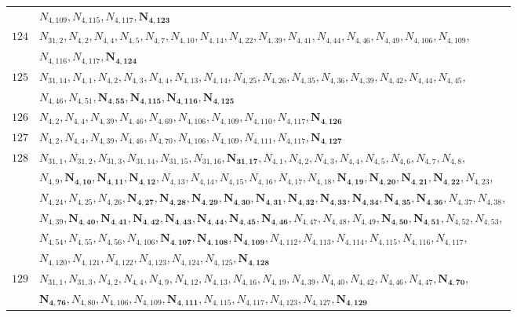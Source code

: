 \documentclass{amsart}
\theoremstyle{plain}
\theoremstyle{definition}
\theoremstyle{remark}
\begin{document}
{\begin{longtable}{ll}
& $N_{4,109}, N_{4,115}, N_{4,117}, \bm{N_{4,123}}$\\
$124$ & $N_{31,2}, N_{4,2}, N_{4,4}, N_{4,5}, N_{4,7}, N_{4,10}, N_{4,14}, N_{4,22}, N_{4,39}, N_{4,41}, N_{4,44}, N_{4,46}, N_{4,49}, N_{4,106}, N_{4,109}$,\\ 
& $N_{4,116}, N_{4,117}, \bm{N_{4,124}}$\\
$125$ & $N_{31,14}, N_{4,1}, N_{4,2}, N_{4,3}, N_{4,4}, N_{4,13}, N_{4,14}, N_{4,25}, N_{4,26}, N_{4,35}, N_{4,36}, N_{4,39}, N_{4,42}, N_{4,44}, N_{4,45}$,\\ 
& $N_{4,46}, N_{4,51}, \bm{N_{4,55}}, \bm{N_{4,115}}, \bm{N_{4,116}}, \bm{N_{4,125}}$\\
$126$ & $N_{4,2}, N_{4,4}, N_{4,39}, N_{4,46}, N_{4,69}, N_{4,106}, N_{4,109}, N_{4,110}, N_{4,117}, \bm{N_{4,126}}$\\
$127$ & $N_{4,2}, N_{4,4}, N_{4,39}, N_{4,46}, N_{4,70}, N_{4,106}, N_{4,109}, N_{4,111}, N_{4,117}, \bm{N_{4,127}}$\\
$128$ & $N_{31,1}, N_{31,2}, N_{31,3}, N_{31,14}, N_{31,15}, N_{31,16}, \bm{N_{31,17}}, N_{4,1}, N_{4,2}, N_{4,3}, N_{4,4}, N_{4,5}, N_{4,6}, N_{4,7}, N_{4,8}$,\\ 
& $N_{4,9}, \bm{N_{4,10}}, \bm{N_{4,11}}, \bm{N_{4,12}}, N_{4,13}, N_{4,14}, N_{4,15}, N_{4,16}, N_{4,17}, N_{4,18}, \bm{N_{4,19}}, \bm{N_{4,20}}, \bm{N_{4,21}}, \bm{N_{4,22}}, N_{4,23}$,\\ 
& $N_{4,24}, N_{4,25}, N_{4,26}, \bm{N_{4,27}}, \bm{N_{4,28}}, \bm{N_{4,29}}, \bm{N_{4,30}}, \bm{N_{4,31}}, \bm{N_{4,32}}, \bm{N_{4,33}}, \bm{N_{4,34}}, \bm{N_{4,35}}, \bm{N_{4,36}}, N_{4,37}, N_{4,38}$,\\ 
& $N_{4,39}, \bm{N_{4,40}}, \bm{N_{4,41}}, \bm{N_{4,42}}, \bm{N_{4,43}}, \bm{N_{4,44}}, \bm{N_{4,45}}, \bm{N_{4,46}}, N_{4,47}, N_{4,48}, N_{4,49}, \bm{N_{4,50}}, \bm{N_{4,51}}, N_{4,52}, N_{4,53}$,\\ 
& $N_{4,54}, N_{4,55}, N_{4,56}, N_{4,106}, \bm{N_{4,107}}, \bm{N_{4,108}}, \bm{N_{4,109}}, N_{4,112}, N_{4,113}, N_{4,114}, N_{4,115}, N_{4,116}, N_{4,117}$,\\ 
& $N_{4,120}, N_{4,121}, N_{4,122}, N_{4,123}, N_{4,124}, N_{4,125}, \bm{N_{4,128}}$\\
$129$ & $N_{31,1}, N_{31,3}, N_{4,2}, N_{4,4}, N_{4,9}, N_{4,12}, N_{4,13}, N_{4,16}, N_{4,19}, N_{4,39}, N_{4,40}, N_{4,42}, N_{4,46}, N_{4,47}, \bm{N_{4,70}}$,\\ 
& $\bm{N_{4,76}}, N_{4,80}, N_{4,106}, N_{4,109}, \bm{N_{4,111}}, N_{4,115}, N_{4,117}, N_{4,123}, N_{4,127}, \bm{N_{4,129}}$\\

\end{longtable}}
\end{document}
